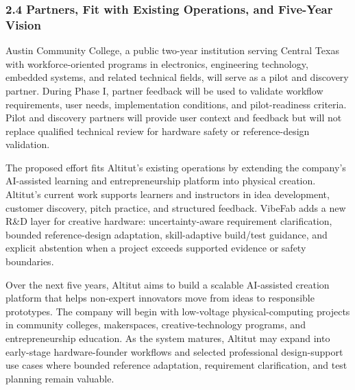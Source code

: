 \subsubsection*{2.4 Partners, Fit with Existing Operations, and Five-Year Vision}

Austin Community College, a public two-year institution serving Central Texas with workforce-oriented programs in electronics, engineering technology, embedded systems, and related technical fields, will serve as a pilot and discovery partner. During Phase I, partner feedback will be used to validate workflow requirements, user needs, implementation conditions, and pilot-readiness criteria. Pilot and discovery partners will provide user context and feedback but will not replace qualified technical review for hardware safety or reference-design validation.

The proposed effort fits Altitut's existing operations by extending the company's AI-assisted learning and entrepreneurship platform into physical creation. Altitut's current work supports learners and instructors in idea development, customer discovery, pitch practice, and structured feedback. VibeFab adds a new R\&D layer for creative hardware: uncertainty-aware requirement clarification, bounded reference-design adaptation, skill-adaptive build/test guidance, and explicit abstention when a project exceeds supported evidence or safety boundaries.

Over the next five years, Altitut aims to build a scalable AI-assisted creation platform that helps non-expert innovators move from ideas to responsible prototypes. The company will begin with low-voltage physical-computing projects in community colleges, makerspaces, creative-technology programs, and entrepreneurship education. As the system matures, Altitut may expand into early-stage hardware-founder workflows and selected professional design-support use cases where bounded reference adaptation, requirement clarification, and test planning remain valuable.


